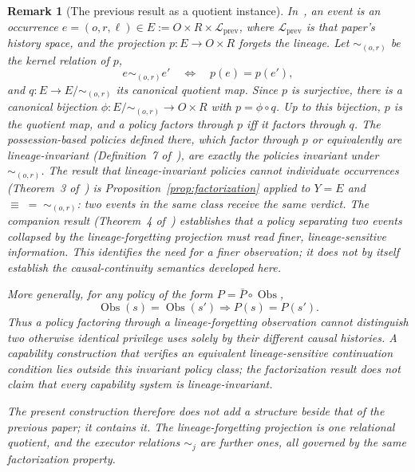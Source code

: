 \documentclass[10pt,twocolumn]{article}
\newtheorem{remark}{Remark}
\begin{document}
\begin{remark}[The previous result as a quotient instance]\label{rem:instance}
In~\cite{gallo2026poc}, an event is an occurrence
\(e=(o,r,\ell)\in E:=O\times R\times\mathcal L_{\mathrm{prev}}\), where
\(\mathcal L_{\mathrm{prev}}\) is that paper's history space, and the projection
\(p:E\rightarrow O\times R\) forgets the lineage. Let \(\sim_{(o,r)}\) be the
kernel relation of \(p\),
\[
e\sim_{(o,r)}e'
\quad\Longleftrightarrow\quad
p(e)=p(e'),
\]
and \(q:E\rightarrow E/{\sim_{(o,r)}}\) its canonical quotient map. Since \(p\)
is surjective, there is a canonical bijection
\(\phi:E/{\sim_{(o,r)}}\rightarrow O\times R\) with \(p=\phi\circ q\). Up to
this bijection, \(p\) is the quotient map, and a policy factors through \(p\)
iff it factors through \(q\).
The possession-based policies defined there, which factor through \(p\) or
equivalently are lineage-invariant (Definition~7 of~\cite{gallo2026poc}), are
exactly the policies invariant under \(\sim_{(o,r)}\). The result that
lineage-invariant policies cannot individuate occurrences (Theorem~3
of~\cite{gallo2026poc}) is Proposition~\ref{prop:factorization} applied to
\(Y=E\) and \(\equiv\;=\;\sim_{(o,r)}\): two events in the same class receive the
same verdict. The companion result (Theorem~4 of~\cite{gallo2026poc})
establishes that a policy separating two events collapsed by the
lineage-forgetting projection must read finer, lineage-sensitive information.
This identifies the need for a finer observation; it does not by itself
establish the causal-continuity semantics developed here.

More generally, for any policy of the form \(P=\bar P\circ\operatorname{Obs}\),
\[
\operatorname{Obs}(s)=\operatorname{Obs}(s')
\Longrightarrow
P(s)=P(s').
\]
Thus a policy factoring through a lineage-forgetting observation cannot
distinguish two otherwise identical privilege uses solely by their different
causal histories. A capability construction that verifies an equivalent
lineage-sensitive continuation condition lies outside this invariant policy
class; the factorization result does not claim that every capability system is
lineage-invariant.

The present construction therefore does not add a structure beside that of the
previous paper; it contains it. The lineage-forgetting projection is one
relational quotient, and the executor relations \(\sim_j\) are further ones,
all governed by the same factorization property.
\end{remark}
\end{document}
